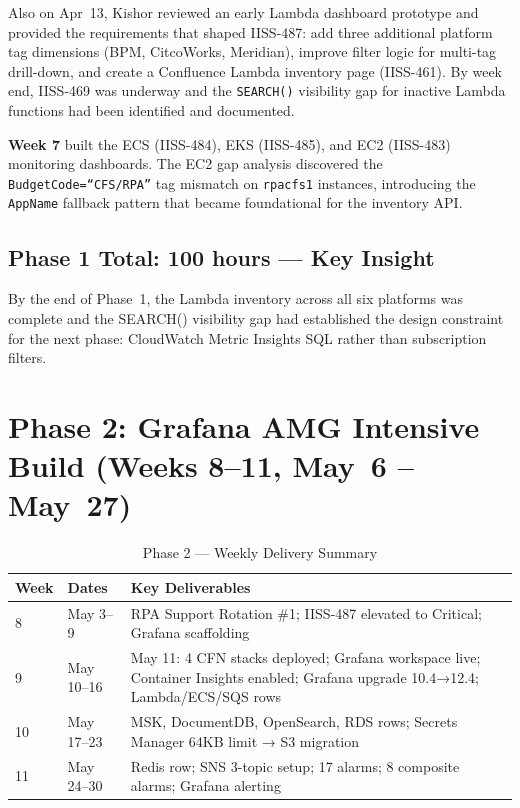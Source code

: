 Also on Apr~13, Kishor reviewed an early Lambda dashboard prototype and provided
the requirements that shaped IISS-487: add three additional platform tag
dimensions (BPM, CitcoWorks, Meridian), improve filter logic for multi-tag
drill-down, and create a Confluence Lambda inventory page (IISS-461). By week
end, IISS-469 was underway and the \texttt{SEARCH()} visibility gap for
inactive Lambda functions had been identified and documented.

\textbf{Week 7} built the ECS (IISS-484), EKS (IISS-485), and EC2 (IISS-483)
monitoring dashboards. The EC2 gap analysis discovered the
\texttt{BudgetCode=``CFS/RPA''} tag mismatch on \texttt{rpacfs1} instances,
introducing the \texttt{AppName} fallback pattern that became foundational for
the inventory API.

\subsection{Phase 1 Total: 100 hours --- Key Insight}

By the end of Phase~1, the Lambda inventory across all six platforms was complete
and the SEARCH() visibility gap had established the design constraint for the
next phase: CloudWatch Metric Insights SQL rather than subscription filters.

\section{Phase 2: Grafana AMG Intensive Build (Weeks 8--11, May~6 -- May~27)}
\label{sec:wb_phase2}

\begin{table}[ht]
\centering
\caption{Phase 2 --- Weekly Delivery Summary}
\label{tab:wb_phase2}
\begin{tabular}{p{1.2cm}p{4.0cm}p{7.5cm}}
\toprule
\textbf{Week} & \textbf{Dates} & \textbf{Key Deliverables} \\
\midrule
8 & May 3--9 & RPA Support Rotation \#1; IISS-487 elevated to Critical; Grafana scaffolding \\
9 & May 10--16 & May 11: 4 CFN stacks deployed; Grafana workspace live; Container Insights enabled; Grafana upgrade 10.4→12.4; Lambda/ECS/SQS rows \\
10 & May 17--23 & MSK, DocumentDB, OpenSearch, RDS rows; Secrets Manager 64KB limit → S3 migration \\
11 & May 24--30 & Redis row; SNS 3-topic setup; 17 alarms; 8 composite alarms; Grafana alerting \\
\bottomrule
\end{tabular}
\end{table}

